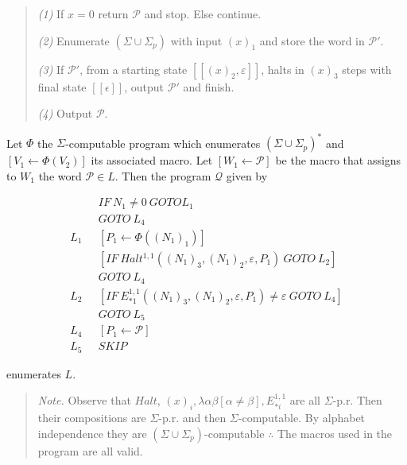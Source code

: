 \documentclass[a4paper, 12pt]{article}
\begin{document}
\begin{quote}
    \textit{(1)} If $x = 0$ return $\mathcal{P}$ and stop. Else continue.

    \textit{(2)} Enumerate $(\Sigma \cup \Sigma_p)$ with input $(x)_1$ and store
    the word in $\mathcal{P'}$.

    \textit{(3)} If $\mathcal{P}'$, from a starting state $[\![ (x)_2,
    \varepsilon  ]\!]$, halts in $(x)_3$ steps with final state $[\![ \epsilon
    ]\!]$, output $\mathcal{P}'$ and finish. 

    \textit{(4)} Output $\mathcal{P}$.
\end{quote}

Let $\Phi$ the $\Sigma$-computable program which enumerates $(\Sigma \cup
\Sigma_p)^*$ and $\left[ V_1 \leftarrow \Phi(V_2) \right] $ its associated
macro. Let $[W_1 \leftarrow \mathcal{P}]$ be the macro that assigns to $W_1$ the
word $\mathcal{P} \in  L$. Then the program $\mathcal{Q}$ given by


\begin{align*}
    &IF ~ N_1 \neq 0 ~ GOTO L_1 \\ 
    &GOTO ~ L_4 \\ 
    L_1 ~ ~ ~ &[P_1 \leftarrow \Phi( (N_1)_1 )] \\ 
              & [IF ~ Halt^{1, 1} \left( (N_1)_3, (N_1)_2, \varepsilon, P_1
              \right) ~ GOTO ~ L_2] \\ 
              &GOTO ~ L_4 \\ 
    L_2 ~ ~ ~ & [IF ~ E_{* 1}^{1, 1} \left( (N_1)_3, (N_1)_2, \varepsilon,
    P_1\right) \neq \varepsilon ~ GOTO ~ L_4] \\  
              &GOTO ~ L_5\\
        L_4 ~ ~ ~ & [ P_1 \leftarrow \mathcal{P} ] \\ 
        L_5 ~ ~ ~ &SKIP
\end{align*}

enumerates $L$. 


\small
\begin{quote}

\textit{Note.} Observe that $Halt$, $(x)_i, \lambda \alpha\beta \left[ \alpha
\neq \beta   \right], E_{*i}^{1, 1}$ are all $\Sigma$-p.r.  Then their
compositions are $\Sigma$-p.r. and then $\Sigma$-computable. By alphabet
independence they are $(\Sigma \cup \Sigma_p)$-computable $\therefore $ The
macros used in the program are all valid.

\end{quote}
\normalsize
\end{document}
